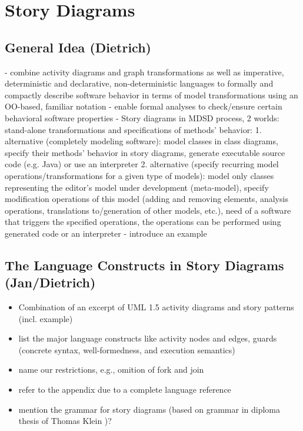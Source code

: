 \section{Story Diagrams} \label{sec:StoryDiagrams}

\subsection{General Idea (Dietrich)}

- combine activity diagrams and graph transformations as well as imperative, deterministic and declarative, non-deterministic languages to formally and compactly describe software behavior in terms of model transformations using an OO-based, familiar notation
- enable formal analyses to check/ensure certain behavioral software properties
- Story diagrams in MDSD process, 2 worlds: stand-alone transformations and specifications of methods' behavior:
  1. alternative (completely modeling software): model classes in class diagrams, specify their methods' behavior in story diagrams, generate executable source code (e.g. Java) or use an interpreter
  2. alternative (specify recurring model operations/transformations for a given type of models): model only classes representing the editor's model under development (meta-model), specify modification operations of this model (adding and removing elements, analysis operations, translations to/generation of other models, etc.), need of a software that triggers the specified operations, the operations can be performed using generated code or an interpreter
- introduce an example


\subsection{The Language Constructs in Story Diagrams (Jan/Dietrich)}\label{sec:StoryDiagrams:composition}

\begin{itemize}
  \item Combination of an excerpt of UML 1.5 activity diagrams and story patterns (incl. example)
  \item list the major language constructs like activity nodes and edges, guards (concrete syntax, well-formedness, and execution semantics)
  \item name our restrictions, e.g., omition of fork and join
  \item refer to the appendix due to a complete language reference
  \item mention the grammar for story diagrams (based on grammar in diploma thesis of Thomas Klein \cite{Kle99})?
\end{itemize}


